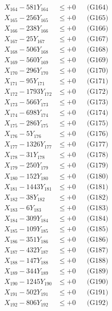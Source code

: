 \documentclass[a4paper,10pt]{article}
\begin{document}
{\begin{align}
X_{164} - 581Y_{164} &\leq +0 && \text{(G164)} \\
X_{165} - 256Y_{165} &\leq +0 && \text{(G165)} \\
X_{166} - 238Y_{166} &\leq +0 && \text{(G166)} \\
X_{167} - 25Y_{167} &\leq +0 && \text{(G167)} \\
X_{168} - 506Y_{168} &\leq +0 && \text{(G168)} \\
X_{169} - 560Y_{169} &\leq +0 && \text{(G169)} \\
X_{170} - 296Y_{170} &\leq +0 && \text{(G170)} \\
\allowbreak
X_{171} - 95Y_{171} &\leq +0 && \text{(G171)} \\
X_{172} - 1793Y_{172} &\leq +0 && \text{(G172)} \\
X_{173} - 566Y_{173} &\leq +0 && \text{(G173)} \\
X_{174} - 698Y_{174} &\leq +0 && \text{(G174)} \\
X_{175} - 286Y_{175} &\leq +0 && \text{(G175)} \\
X_{176} - 5Y_{176} &\leq +0 && \text{(G176)} \\
X_{177} - 1326Y_{177} &\leq +0 && \text{(G177)} \\
X_{178} - 31Y_{178} &\leq +0 && \text{(G178)} \\
X_{179} - 250Y_{179} &\leq +0 && \text{(G179)} \\
X_{180} - 152Y_{180} &\leq +0 && \text{(G180)} \\
\allowbreak
X_{181} - 1443Y_{181} &\leq +0 && \text{(G181)} \\
X_{182} - 38Y_{182} &\leq +0 && \text{(G182)} \\
X_{183} - 6Y_{183} &\leq +0 && \text{(G183)} \\
X_{184} - 309Y_{184} &\leq +0 && \text{(G184)} \\
X_{185} - 109Y_{185} &\leq +0 && \text{(G185)} \\
X_{186} - 351Y_{186} &\leq +0 && \text{(G186)} \\
X_{187} - 432Y_{187} &\leq +0 && \text{(G187)} \\
X_{188} - 147Y_{188} &\leq +0 && \text{(G188)} \\
X_{189} - 344Y_{189} &\leq +0 && \text{(G189)} \\
X_{190} - 1245Y_{190} &\leq +0 && \text{(G190)} \\
\allowbreak
X_{191} - 502Y_{191} &\leq +0 && \text{(G191)} \\
X_{192} - 806Y_{192} &\leq +0 && \text{(G192)} \\

\end{align}}
\end{document}
